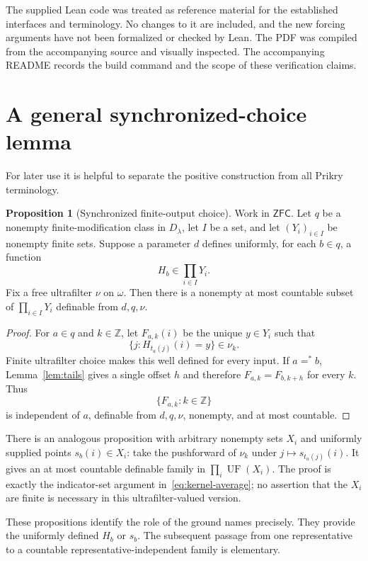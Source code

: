 \documentclass[11pt,letterpaper]{article}
\theoremstyle{definition}
\newtheorem{proposition}[definition]{Proposition}
\numberwithin{equation}{section}
\newcommand{\ZFC}{\mathsf{ZFC}}
\newcommand{\UF}{\operatorname{UF}}
\begin{document}
The supplied Lean code was treated as reference material for the established interfaces and terminology. No changes to it are included, and the new forcing arguments have not been formalized or checked by Lean. The PDF was compiled from the accompanying source and visually inspected. The accompanying README records the build command and the scope of these verification claims.

\section{A general synchronized-choice lemma}\label{app:abstract}

For later use it is helpful to separate the positive construction from all Prikry terminology.

\begin{proposition}[Synchronized finite-output choice]\label{prop:abstract}
Work in $\ZFC$. Let $q$ be a nonempty finite-modification class in $D_\lambda$, let $I$ be a set, and let $(Y_i)_{i\in I}$ be nonempty finite sets. Suppose a parameter $d$ defines uniformly, for each $b\in q$, a function
\[
H_b\in\prod_{i\in I}Y_i.
\]
Fix a free ultrafilter $\nu$ on $\omega$. Then there is a nonempty at most countable subset of $\prod_{i\in I}Y_i$ definable from $d,q,\nu$.
\end{proposition}
\begin{proof}
For $a\in q$ and $k\in\mathbb Z$, let $F_{a,k}(i)$ be the unique $y\in Y_i$ such that
\[
\{j:H_{t_a(j)}(i)=y\}\in\nu_k.
\]
Finite ultrafilter choice makes this well defined for every input. If $a=^*b$, Lemma~\ref{lem:tails} gives a single offset $h$ and therefore $F_{a,k}=F_{b,k+h}$ for every $k$. Thus
\[
\{F_{a,k}:k\in\mathbb Z\}
\]
is independent of $a$, definable from $d,q,\nu$, nonempty, and at most countable.
\end{proof}

There is an analogous proposition with arbitrary nonempty sets $X_i$ and uniformly supplied points $s_b(i)\in X_i$: take the pushforward of $\nu_k$ under $j\mapsto s_{t_a(j)}(i)$. It gives an at most countable definable family in $\prod_i\UF(X_i)$. The proof is exactly the indicator-set argument in~\eqref{eq:kernel-average}; no assertion that the $X_i$ are finite is necessary in this ultrafilter-valued version.

These propositions identify the role of the ground names precisely. They provide the uniformly defined $H_b$ or $s_b$. The subsequent passage from one representative to a countable representative-independent family is elementary.
\end{document}
